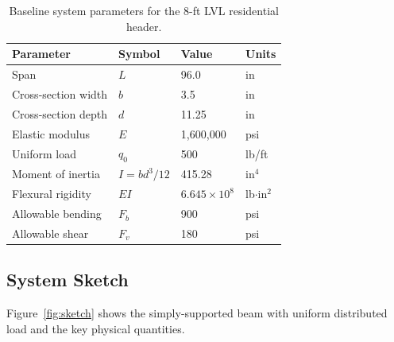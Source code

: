 \documentclass[11pt,letterpaper]{article}
\newcommand{\EI}{EI}
\begin{document}
\begin{table}[ht]
\centering
\caption{Baseline system parameters for the 8-ft LVL residential header.}
\label{tab:params}
\begin{tabular}{llll}
  \toprule
  Parameter & Symbol & Value & Units \\
  \midrule
  Span                & $L$      & 96.0       & in  \\
  Cross-section width & $b$      & 3.5        & in  \\
  Cross-section depth & $d$      & 11.25      & in  \\
  Elastic modulus     & $E$      & 1,600,000  & psi \\
  Uniform load        & $q_0$    & 500        & lb/ft \\
  Moment of inertia   & $I = bd^3/12$ & 415.28 & in$^4$ \\
  Flexural rigidity   & $\EI$    & $6.645\times10^8$ & lb$\cdot$in$^2$ \\
  Allowable bending   & $F_b$    & 900        & psi \\
  Allowable shear     & $F_v$    & 180        & psi \\
  \bottomrule
\end{tabular}
\end{table}

\subsection{System Sketch}

Figure~\ref{fig:sketch} shows the simply-supported beam with uniform distributed
load and the key physical quantities.
\end{document}
